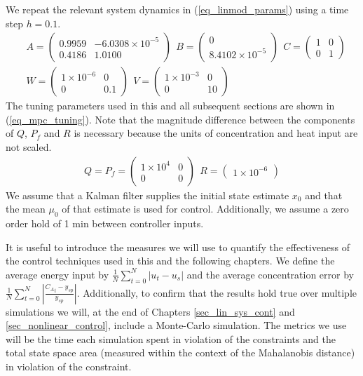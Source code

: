 We repeat the relevant system dynamics in (\ref{eq_linmod_params}) using a time step $h=0.1$. 
\begin{equation}
\begin{aligned}
&A = \begin{pmatrix}
0.9959 & -6.0308\times 10^{-5} \\
0.4186 & 1.0100
\end{pmatrix}
~~B = \begin{pmatrix}
0 \\ 8.4102\times 10^{-5}
\end{pmatrix} ~~
C = \begin{pmatrix}
1 & 0 \\ 0 & 1
\end{pmatrix} \\
&W = \begin{pmatrix}
1\times 10^{-6} & 0 \\ 0 & 0.1
\end{pmatrix} ~~
V = \begin{pmatrix}
1\times 10^{-3} & 0 \\ 0 & 10
\end{pmatrix}
\end{aligned}
\label{eq_linmod_params}
\end{equation}
The tuning parameters used in this and all subsequent sections are shown in (\ref{eq_mpc_tuning}). Note that the magnitude difference between the components of $Q$, $P_f$ and $R$ is necessary because the units of concentration and heat input are not scaled. 
\begin{equation}
\begin{aligned}
Q = P_f = \begin{pmatrix}
1\times 10^{4} & 0 \\ 0 & 0
\end{pmatrix} 
~~R = \begin{pmatrix}
1\times 10^{-6}
\end{pmatrix}
\end{aligned}
\label{eq_mpc_tuning}
\end{equation}
We assume that a Kalman filter supplies the initial state estimate $x_0$ and that the mean $\mu_0$ of that estimate is used for control. Additionally, we assume a zero order hold of 1 min between controller inputs.

It is useful to introduce the measures we will use to quantify the effectiveness of the control techniques used in this and the following chapters. We define the average energy input by $\frac{1}{N}\sum^N_{t=0}|u_t-u_s|$ and the average concentration error by $\frac{1}{N}\sum^N_{t=0}|\frac{{C_A}_t-y_{sp}}{y_{sp}}|$. Additionally, to confirm that the results hold true over multiple simulations we will, at the end of Chapters \ref{sec_lin_sys_cont} and \ref{sec_nonlinear_control}, include a Monte-Carlo simulation. The metrics we use will be the time each simulation spent in violation of the constraints and the total state space area (measured within the context of the Mahalanobis distance) in violation of the constraint. 

